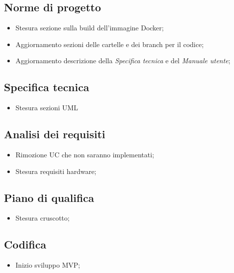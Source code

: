 \subsection{Norme di progetto}
\begin{itemize}
    \item Stesura sezione sulla build dell'immagine Docker;
    \item Aggiornamento sezioni delle cartelle e dei branch per il codice;
    \item Aggiornamento descrizione della \textit{Specifica tecnica} e del \textit{Manuale utente};
\end{itemize}

\subsection{Specifica tecnica}
\begin{itemize}
    \item Stesura sezioni UML
\end{itemize}

\subsection{Analisi dei requisiti}
\begin{itemize}
    \item Rimozione UC che non saranno implementati;
    \item Stesura requisiti hardware;
\end{itemize}

\subsection{Piano di qualifica}
\begin{itemize}
    \item Stesura cruscotto;
\end{itemize}

\subsection{Codifica}
\begin{itemize}
    \item Inizio sviluppo MVP;
\end{itemize}

